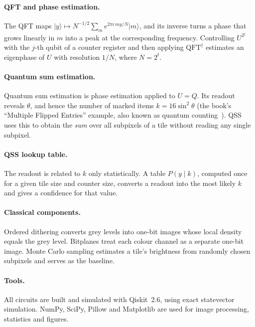 \documentclass[10pt,twocolumn,a4paper]{article}
\newcommand{\ket}[1]{\lvert #1\rangle}
\begin{document}
\paragraph{QFT and phase estimation.}
The QFT maps $\ket{y}\mapsto N^{-1/2}\sum_m e^{2\pi i\,my/N}\ket{m}$, and its
inverse turns a phase that grows linearly in $m$ into a peak at the
corresponding frequency. Controlling $U^{2^j}$ with the $j$-th qubit of a
counter register and then applying $\mathrm{QFT}^\dagger$ estimates an
eigenphase of $U$ with resolution $1/N$, where $N=2^t$.

\paragraph{Quantum sum estimation.}
Quantum sum estimation is phase estimation applied to $U=Q$. Its readout
reveals $\theta$, and hence the number of marked items $k=16\sin^2\theta$
(the book's ``Multiple Flipped Entries'' example, also known as quantum
counting~\cite{brassard}). QSS uses this to obtain the \emph{sum} over all
subpixels of a tile without reading any single subpixel.

\paragraph{QSS lookup table.}
The readout is related to $k$ only statistically. A table $P(y\mid k)$,
computed once for a given tile size and counter size, converts a readout into
the most likely $k$ and gives a confidence for that value.

\paragraph{Classical components.}
Ordered dithering converts grey levels into one-bit images whose local density
equals the grey level. Bitplanes treat each colour channel as a separate
one-bit image. Monte Carlo sampling estimates a tile's brightness from
randomly chosen subpixels and serves as the baseline.

\paragraph{Tools.}
All circuits are built and simulated with Qiskit~2.6, using exact
statevector simulation. NumPy, SciPy, Pillow and Matplotlib are used for image
processing, statistics and figures.

\end{document}
